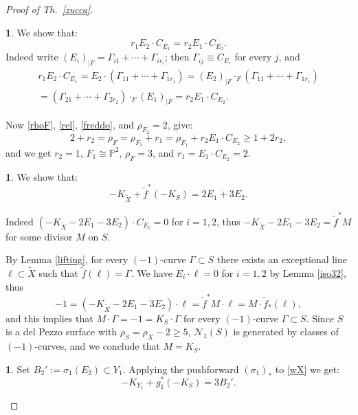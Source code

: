 \documentclass[a4paper,12pt]{amsart}
\theoremstyle{definition}
\newtheorem{prg}[thm]{}
\numberwithin{figure}{section}
\numberwithin{table}{section}
\newcommand{\w}{\widetilde}
\newcommand{\pr}{\mathbb{P}}
\newcommand{\N}{\mathcal{N}_1}
\begin{document}
\begin{proof}[Proof of Th.~\ref{zucca}]
\begin{prg}
  We show that:
  \begin{equation}\label{rel}
    r_1E_{2}\cdot C_{E_{1}}=r_2E_{1}\cdot C_{E_{2}}.
    \end{equation}
Indeed write $(E_{i})_{|F}=\Gamma_{i1}+\cdots+\Gamma_{ir_i}$; then $\Gamma_{ij}\equiv C_{E_i}$ for every $j$, and
\begin{gather*}
  r_1E_{2}\cdot C_{E_{1}}=E_2\cdot (\Gamma_{11}+\cdots+\Gamma_{1r_1})=(E_{2})_{|F}\cdot_F(\Gamma_{11}+\cdots+\Gamma_{1r_1})\\=(\Gamma_{21}+\cdots+\Gamma_{2r_2})\cdot_F
  (E_1)_{|F}=r_2E_{1}\cdot C_{E_{2}}.
  \end{gather*}
  
  Now \eqref{rhoF}, \eqref{rel}, \eqref{freddo}, and $\rho_{F_2}=2$, give:
$$2+r_{2}=\rho_F=\rho_{F_{1}}+r_{1}=\rho_{F_{1}}+r_{2}E_{1}\cdot C_{E_{2}}\geq 1+2r_2,$$
 and we get  $r_{2}=1$, $F_{1}\cong\pr^2$, $\rho_F=3$,  and
  $r_{1}=E_{1}\cdot C_{E_{2}}=2$.
\end{prg}
\begin{prg}  
  We show that:
\begin{equation}
  \label{wX}
  -K_{\w{X}}+\tilde{f}^*(-K_S)=2E_{1}+3E_{2}.\end{equation}

  Indeed
  $(-K_{\w{X}}-2E_{1}-3E_{2})\cdot C_{E_{i}}=0$ for $i=1,2$, thus 
$-K_{\w{X}}-2E_{1}-3E_{2}=\tilde{f}^*M$ for some divisor $M$ on $S$.

By Lemma \ref{lifting}, for every $(-1)$-curve $\Gamma\subset S$ there exists an exceptional line $\ell\subset \w{X}$ such that $\tilde{f}(\ell)=\Gamma$. We have $E_i\cdot\ell=0$ for $i=1,2$ by Lemma \ref{iso32}, thus
$$-1=(-K_{\w{X}}-2E_{1}-3E_{2})\cdot\ell=\tilde{f}^*M\cdot\ell=M\cdot \tilde{f}_*(\ell),$$
and this implies that 
$M\cdot\Gamma=-1=K_S\cdot\Gamma$ for every $(-1)$-curve $\Gamma\subset S$. Since $S$ is a del Pezzo surface with $\rho_S=\rho_X-2\geq 5$, $\N(S)$ is generated by classes of $(-1)$-curves, and we conclude that $M=K_S$.
\end{prg}
\begin{prg}\label{usseaux}
 Set $B_2':=\sigma_1(E_2)\subset Y_1$. Applying the pushforward $(\sigma_1)_*$ to \eqref{wX} we get:
\begin{equation}\label{formula}
  -K_{Y_1}+g_1^*(-K_S)=3B_2'.
\end{equation}


\end{prg}
\end{proof}
\end{document}
